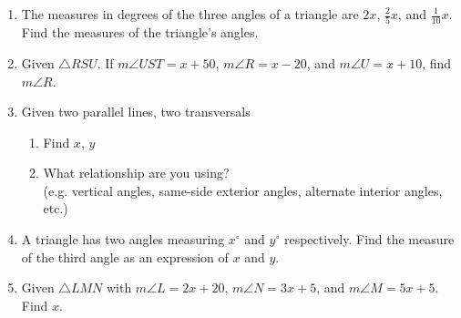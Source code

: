 \begin{enumerate}
\item The measures in degrees of the three angles of a triangle are $2x$, $\frac{2}{5}x$, and $\frac{1}{10}x$. Find the measures of the triangle's angles. \vspace{4cm}

\newpage
\item Given $\triangle RSU$. If $m\angle UST=x+50$, $m\angle R=x-20$, and $m\angle U=x+10$, find $m\angle R$.
  \begin{flushright}
  \end{flushright} \vspace{2cm}

\item Given two parallel lines, two transversals
\begin{multicols}{2}
  \begin{enumerate}
    \item Find $x$, $y$
    \item What relationship are you using? \\[0.5cm]
    (e.g. vertical angles, same-side exterior angles, alternate interior angles, etc.)
  \end{enumerate}
\end{multicols}

\item A triangle has two angles measuring $x^\circ$ and $y^\circ$ respectively. Find the measure of the third angle as an expression of $x$ and $y$. \vspace{2cm}

\newpage
\item Given  $\triangle LMN$ with $m\angle L=2x+20$, $m\angle N=3x+5$, and $m\angle M=5x+5$. Find $x$.
  \begin{flushright}
  \end{flushright} \vspace{2cm}


\end{enumerate}
